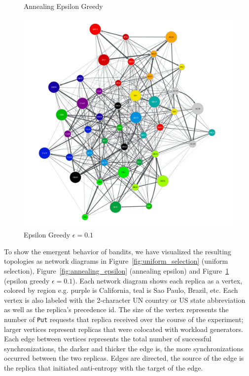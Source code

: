 \begin{figure}[t]
      \caption{Annealing Epsilon Greedy}\label{fig:annealing_epsilon}
    \endminipage\hfill
      \includegraphics[width=\linewidth]{figures/b-epsilon-greedy-0-1-e2}
      \caption{Epsilon Greedy $\epsilon=0.1$}\label{fig:epsilon_greedy_e1}
    \endminipage
\end{figure}

To show the emergent behavior of bandits, we have visualized the resulting
topologies as network diagrams in Figure~\ref{fig:uniform_selection} (uniform
selection), Figure~\ref{fig:annealing_epsilon} (annealing epsilon) and
Figure~\ref{fig:epsilon_greedy_e1} (epsilon greedy $\epsilon=0.1$).
Each network diagram shows each replica as a vertex, colored by region e.g.
purple is California, teal is Sao Paulo, Brazil, etc.
Each vertex is also labeled with the 2-character UN country or US state
abbreviation as well as the replica's precedence id.
The size of the vertex represents the number of \texttt{Put} requests that
replica received over the course of the experiment; larger vertices
represent replicas that were colocated with workload generators.
Each edge between vertices represents the total number of successful
synchronizations, the darker and thicker the edge is, the more
synchronizations occurred between the two replicas.
Edges are directed, the source of the edge is the replica that initiated
anti-entropy with the target of the edge.

